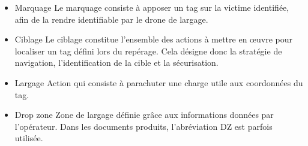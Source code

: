 \begin{itemize}
\item Marquage\newline
Le marquage consiste à apposer un tag sur la victime identifiée, afin de la
rendre identifiable par le drone de largage.\newline

\item Ciblage\newline
Le ciblage constitue l’ensemble des actions à mettre en œuvre pour
localiser un tag défini lors du repérage. Cela désigne donc la stratégie de
navigation, l’identification de la cible et la sécurisation.\newline

\item Largage\newline
Action qui consiste à parachuter une charge utile aux coordonnées du
tag.\newline

  \item Drop zone\newline
Zone de largage définie grâce aux informations données par l’opérateur.
Dans les documents produits, l’abréviation DZ est parfois utilisée.
\end{itemize}
